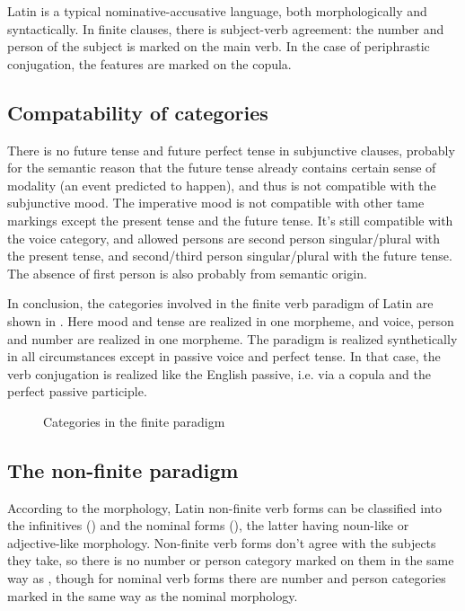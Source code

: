 \documentclass[a4paper, oneside, 12pt]{report}
\begin{document}
Latin is a typical nominative-accusative language,
both morphologically and syntactically.
In finite clauses, 
there is subject-verb agreement:
the number and person of the subject is marked on the main verb.
In the case of periphrastic conjugation,
the features are marked on the copula.

\subsection{Compatability of categories}

There is no \acl{future} tense and \acl{future perfect} tense in subjunctive clauses,
probably for the semantic reason
that the future tense already contains certain sense of modality
(an event predicted to happen),
and thus is not compatible with the \acl{subjunctive} mood.
The \acl{imperative} mood is not compatible with other \ac{tame} markings
except the \acl{present} tense and the \acl{future} tense.
It's still compatible with the voice category,
and allowed persons are 
second person singular/plural with the \acl{present} tense,
and second/third person singular/plural with the \acl{future} tense.
The absence of first person is also probably from semantic origin.

In conclusion, the categories involved in the finite verb paradigm of Latin 
are shown in .
Here mood and tense are realized in one morpheme,
and voice, person and number are realized in one morpheme.
The paradigm is realized synthetically in all circumstances 
except in passive voice and perfect tense.
In that case, the verb conjugation is realized like the English passive,
i.e. via a copula and the perfect passive participle.

\begin{figure}[H]
    \centering
    
    \caption{Categories in the finite paradigm}
    \label{fig:paradigm-finite-verb}
\end{figure}


\subsection{The non-finite paradigm}\label{sec:non-finite-abs}

According to the morphology,
Latin non-finite verb forms can be classified into the infinitives ()
and the nominal forms (),
the latter having noun-like or adjective-like morphology.
Non-finite verb forms don't agree with the subjects they take,
so there is no number or person category marked on them in the same way as ,
though for nominal verb forms there are number and person categories 
marked in the same way as the nominal morphology.
\end{document}
